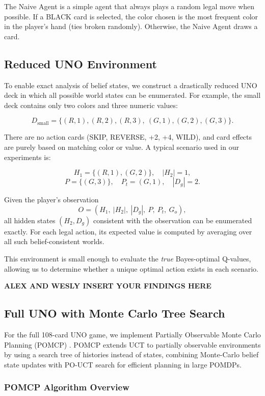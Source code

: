\documentclass[journal,transmag]{IEEEtran}
\begin{document}
The Naive Agent is a simple agent that always plays a random legal move when possible. If a BLACK card is selected, the color chosen is the most frequent color in the player's hand (ties broken randomly). Otherwise, the Naive Agent draws a card.

\subsection{Reduced UNO Environment}

To enable exact analysis of belief states, we construct a drastically
reduced UNO deck in which all possible world states can be enumerated.
For example, the small deck contains only two colors and three numeric values:

\[
D_{\text{small}} =
\{(R,1), (R,2), (R,3),\ (G,1), (G,2), (G,3)\}.
\]

There are no action cards (SKIP, REVERSE, +2, +4, WILD), and card effects
are purely based on matching color or value. A typical scenario used in
our experiments is:

\[
H_1 = \{(R,1), (G,2)\},\quad |H_2| = 1,
\]
\[
P = \{(G,3)\},\quad P_t = (G,1),\quad |D_g| = 2.
\]

Given the player's observation
\[
O = (H_1,\ |H_2|,\ |D_g|,\ P,\ P_t,\ G_o),
\]
all hidden states \((H_2, D_g)\) consistent with the observation can be
enumerated exactly. For each legal action, its expected value is computed
by averaging over all such belief-consistent worlds.

This environment is small enough to evaluate the \emph{true}
Bayes-optimal Q-values, allowing us to determine whether a unique
optimal action exists in each scenario.

\textbf{ALEX AND WESLY INSERT YOUR FINDINGS HERE}


\subsection{Full UNO with Monte Carlo Tree Search}

For the full 108-card UNO game, we implement Partially Observable Monte Carlo Planning (POMCP) \cite{silver2011monte}. POMCP extends UCT to partially observable environments by using a search tree of histories instead of states, combining Monte-Carlo belief state updates with PO-UCT search for efficient planning in large POMDPs.\\

\subsubsection{POMCP Algorithm Overview}
\end{document}
